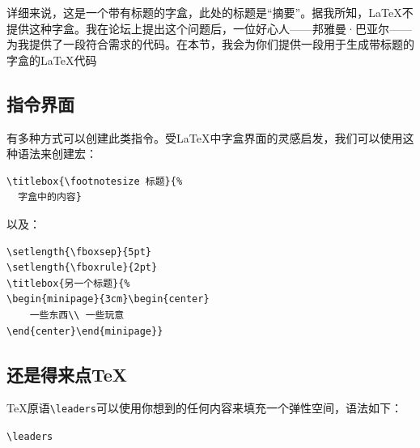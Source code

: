 详细来说，这是一个带有标题的字盒，此处的标题是``摘要''。据我所知，\LaTeX 不提供这种字盒。我在论坛上提出这个问题后，一位好心人——邦雅曼·巴亚尔——为我提供了一段符合需求的代码。在本节，我会为你们提供一段用于生成带标题的字盒的\LaTeX 代码

\subsection{指令界面}

有多种方式可以创建此类指令。受\LaTeX 中字盒界面的灵感启发，我们可以使用这种语法来创建宏：

\begin{codelist}[10.11]{
}
\begin{verbatim}
\titlebox{\footnotesize 标题}{%
  字盒中的内容}\end{verbatim}
\end{codelist}

以及：

\begin{codelist}[10.12]{
    \setlength{\fboxsep}{5pt}
\setlength{\fboxrule}{2pt}
}
\begin{verbatim}
\setlength{\fboxsep}{5pt}
\setlength{\fboxrule}{2pt}
\titlebox{另一个标题}{%
\begin{minipage}{3cm}\begin{center} 
    一些东西\\ 一些玩意
\end{center}\end{minipage}}\end{verbatim}
\end{codelist}

\subsection{还是得来点\TeX}

\TeX 原语\verb|\leaders|可以使用你想到的任何内容来填充一个弹性空间，语法如下：

\begin{dmd}
\verb|\leaders|
\end{dmd}


